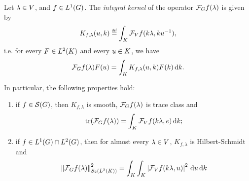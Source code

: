 \begin{lemma}
\label{lemma:kernels_of_Fourier_coefficients}
    Let $\lambda \in \VectorSpace$, and $f \in \Lebesgue{1}\Group$.
    The \emph{integral kernel} of the operator $\Fourier f(\lambda)$ is given by
    \begin{align}
        K_{f, \lambda}(u, k) \defeq \int_\CompactGroup \Fourier[\VectorSpace] f(k \lambda, k u^{-1}),
        \label{integral_kernel_of_Fourier_coefficient}
    \end{align}
    i.e. for every $F \in \Lebesgue{2}\CompactGroup$ and every $u \in \CompactGroup$, we have
    \begin{align*}
        \Fourier f(\lambda) F(u) = \int_\CompactGroup K_{f, \lambda}(u, k) F(k) \dd k.
    \end{align*}

    In particular, the following properties hold:
    \begin{enumerate}
        \item if $f \in \Schwartz\Group$, then $K_{f, \lambda}$ is smooth,
            $\Fourier f(\lambda)$ is trace class and
            \begin{align*}
                \tr(\Fourier f(\lambda)) = \int_\CompactGroup \Fourier[\VectorSpace] f(k \lambda, e) \dd k;
            \end{align*}
        \item if $f \in \Lebesgue{1}\Group \cap \Lebesgue{2}\Group$, then for almost every $\lambda \in \VectorSpace$,
            $K_{f, \lambda}$ is Hilbert-Schmidt and
            \begin{align*}
                \norm[\SchattenClasses{2}{\Lebesgue{2}\CompactGroup}]{\Fourier f(\lambda)}^2
                = \int_\CompactGroup \int_\CompactGroup \abs{\Fourier[\VectorSpace] f(k \lambda, u)}^2 \dd u \dd k
            \end{align*}
    \end{enumerate}
\end{lemma}
